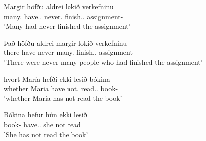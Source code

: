 \documentclass[12pt,%
    times,
]{lin-v2/lin}
\begin{document}
\begin{exe}
    \ex
    \begin{xlist}
        \item \gll Margir höfðu aldrei lokið verkefninu\\
        many.\Adv{} have.\Pst.\Aux{} never.\Adv{} finish.\Pst.\Ptcp{} assignment-\Det\\
        \trans 'Many had never finished the assignment'
        \item \gll Það höfðu aldrei margir lokið verkefninu\\
        there have never many.\Adv{} finish.\Pst.\Ptcp{} assignment-\Det\\
        \trans 'There were never many people who had finished the assignment'
        \item \gll hvort María hefði ekki lesið bókina\\
        whether Maria have not.\Neg{} read.\Pst.\Ptcp{} book-\Det\\
        \trans 'whether Maria has not read the book'
        \item \gll Bókina hefur hún ekki lesið\\     
        book-\Det{} have.\Pst.\Aux{} she not read\\
        \trans 'She has not read the book'
    \end{xlist}
\end{exe}


\begin{exe}
    \ex
    \begin{xlist}
    \item {}
    \dolinks
    \item {}
    \dolinks
    \item {}
    \dolinks
    \item {}
    \dolinks
    \end{xlist}
\end{exe}
\end{document}
